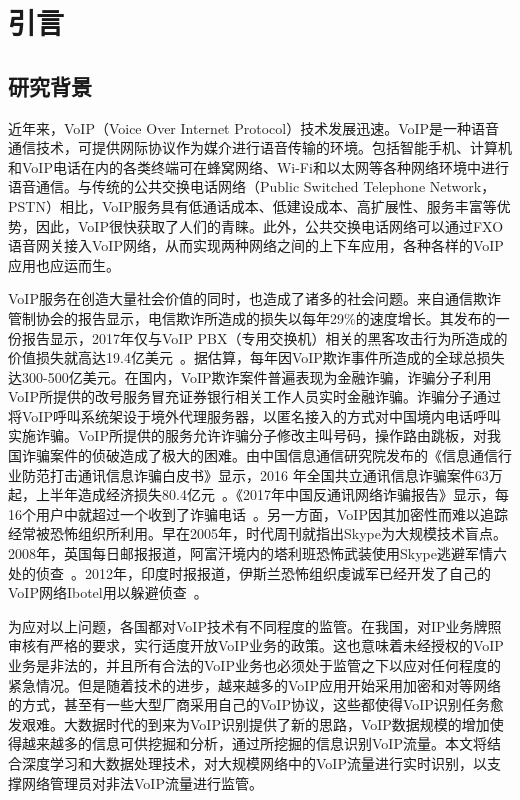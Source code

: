 \newfontfamily{}
\chapter{引言}

\section{研究背景}
近年来，VoIP（Voice Over Internet Protocol）技术发展迅速。VoIP是一种语音通信技术，可提供网际协议作为媒介进行语音传输的环境。包括智能手机、计算机和VoIP电话在内的各类终端可在蜂窝网络、Wi-Fi和以太网等各种网络环境中进行语音通信。与传统的公共交换电话网络（Public Switched Telephone Network，PSTN）相比，VoIP服务具有低通话成本、低建设成本、高扩展性、服务丰富等优势，因此，VoIP很快获取了人们的青睐。此外，公共交换电话网络可以通过FXO语音网关接入VoIP网络，从而实现两种网络之间的上下车应用，各种各样的VoIP应用也应运而生。

VoIP服务在创造大量社会价值的同时，也造成了诸多的社会问题。来自通信欺诈管制协会的报告显示，电信欺诈所造成的损失以每年29\%的速度增长。其发布的一份报告显示，2017年仅与VoIP PBX（专用交换机）相关的黑客攻击行为所造成的价值损失就高达19.4亿美元~\supercite{cfca}。据估算，每年因VoIP欺诈事件所造成的全球总损失达300-500亿美元。在国内，VoIP欺诈案件普遍表现为金融诈骗，诈骗分子利用VoIP所提供的改号服务冒充证券银行相关工作人员实时金融诈骗。诈骗分子通过将VoIP呼叫系统架设于境外代理服务器，以匿名接入的方式对中国境内电话呼叫实施诈骗。VoIP所提供的服务允许诈骗分子修改主叫号码，操作路由跳板，对我国诈骗案件的侦破造成了极大的困难。由中国信息通信研究院发布的《信息通信行业防范打击通讯信息诈骗白皮书》显示，2016 年全国共立通讯信息诈骗案件63万起，上半年造成经济损失80.4亿元~\supercite{caict}。《2017年中国反通讯网络诈骗报告》显示，每16个用户中就超过一个收到了诈骗电话~\supercite{2017}。另一方面，VoIP因其加密性而难以追踪经常被恐怖组织所利用。早在2005年，时代周刊就指出Skype为大规模技术盲点。2008年，英国每日邮报报道，阿富汗境内的塔利班恐怖武装使用Skype逃避军情六处的侦查~\supercite{dailymail}。2012年，印度时报报道，伊斯兰恐怖组织虔诚军已经开发了自己的VoIP网络Ibotel用以躲避侦查~\supercite{timesofindia}。

为应对以上问题，各国都对VoIP技术有不同程度的监管。在我国，对IP业务牌照审核有严格的要求，实行适度开放VoIP业务的政策。这也意味着未经授权的VoIP业务是非法的，并且所有合法的VoIP业务也必须处于监管之下以应对任何程度的紧急情况。但是随着技术的进步，越来越多的VoIP应用开始采用加密和对等网络的方式，甚至有一些大型厂商采用自己的VoIP协议，这些都使得VoIP识别任务愈发艰难。大数据时代的到来为VoIP识别提供了新的思路，VoIP数据规模的增加使得越来越多的信息可供挖掘和分析，通过所挖掘的信息识别VoIP流量。本文将结合深度学习和大数据处理技术，对大规模网络中的VoIP流量进行实时识别，以支撑网络管理员对非法VoIP流量进行监管。

